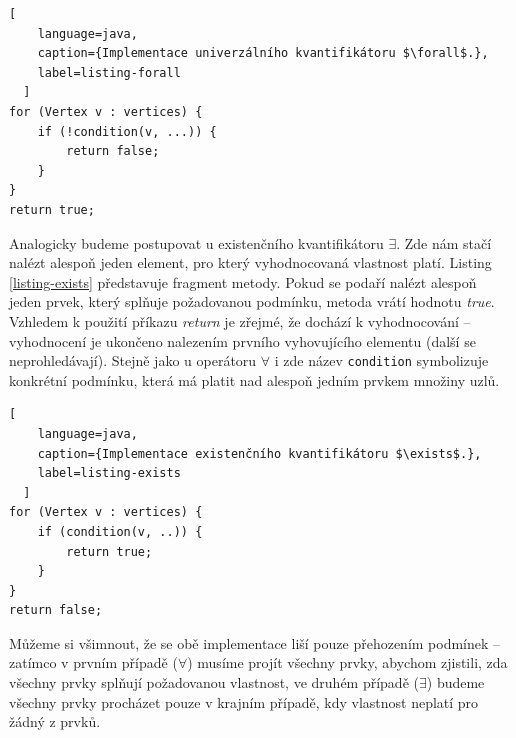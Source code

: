\begin{lstlisting}[
    language=java,
    caption={Implementace univerzálního kvantifikátoru $\forall$.},
    label=listing-forall
  ]
for (Vertex v : vertices) {
    if (!condition(v, ...)) {
        return false;
    }
}
return true;
\end{lstlisting}

Analogicky budeme postupovat u existenčního kvantifikátoru $\exists$. Zde nám stačí nalézt alespoň jeden element, pro který vyhodnocovaná vlastnost platí. Listing \ref{listing-exists} představuje fragment metody. Pokud se podaří nalézt alespoň jeden prvek, který splňuje požadovanou podmínku, metoda vrátí hodnotu \emph{true}. Vzhledem k použití příkazu \emph{return} je zřejmé, že dochází k  vyhodnocování -- vyhodnocení je ukončeno nalezením prvního vyhovujícího elementu (další se neprohledávají). Stejně jako u operátoru $\forall$ i zde název \verb+condition+ symbolizuje konkrétní podmínku, která má platit nad alespoň jedním prvkem množiny uzlů.

\begin{lstlisting}[
    language=java,
    caption={Implementace existenčního kvantifikátoru $\exists$.},
    label=listing-exists
  ]
for (Vertex v : vertices) {
    if (condition(v, ..)) {
        return true;
    }
}
return false;
\end{lstlisting}

Můžeme si všimnout, že se obě implementace liší pouze přehozením podmínek -- zatímco v prvním případě ($\forall$) musíme projít všechny prvky, abychom zjistili, zda všechny prvky splňují požadovanou vlastnost, ve druhém případě ($\exists$) budeme všechny prvky procházet pouze v krajním případě, kdy vlastnost neplatí pro žádný z prvků.

